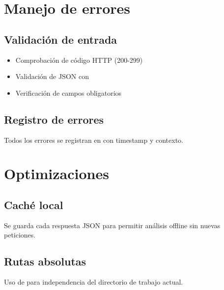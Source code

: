 \section{Manejo de errores}

\subsection{Validación de entrada}
\begin{itemize}
  \item Comprobación de código HTTP (200-299)
  \item Validación de JSON con 
  \item Verificación de campos obligatorios
\end{itemize}

\subsection{Registro de errores}
Todos los errores se registran en  con timestamp y contexto.

\section{Optimizaciones}

\subsection{Caché local}
Se guarda cada respuesta JSON para permitir análisis offline sin nuevas peticiones.

\subsection{Rutas absolutas}
Uso de  para independencia del directorio de trabajo actual.
